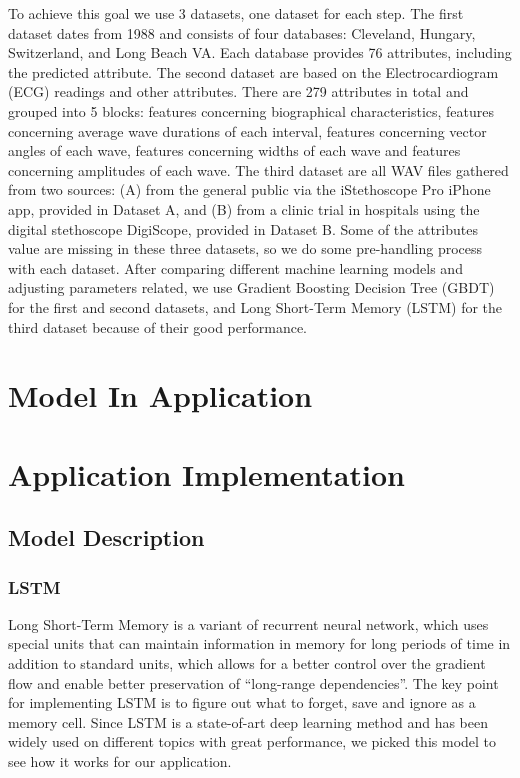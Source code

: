 \documentclass[letterpaper]{article} %
\begin{document}
To achieve this goal we use 3 datasets, one dataset for each step. The first dataset dates from 1988 and consists of four databases: Cleveland, Hungary, Switzerland, and Long Beach VA. Each database provides 76 attributes, including the predicted attribute. The second dataset are based on the Electrocardiogram (ECG) readings and other attributes. There are 279 attributes in total and grouped into 5 blocks: features concerning biographical characteristics, features concerning average wave durations of each interval, features concerning vector angles of each wave, features concerning widths of each wave and features concerning amplitudes of each wave. The third dataset are all WAV files gathered from two sources: (A) from the general public via the iStethoscope Pro iPhone app, provided in Dataset A, and (B) from a clinic trial in hospitals using the digital stethoscope DigiScope, provided in Dataset B. Some of the attributes value are missing in these three datasets, so we do some pre-handling process with each dataset. After comparing different machine learning models and adjusting parameters related, we use Gradient Boosting Decision Tree (GBDT) for the first and second datasets, and Long Short-Term Memory (LSTM) for the third dataset because of their good performance.


\section{Model In Application}

\section{Application Implementation}

\subsection{Model Description}

\subsubsection{LSTM}

Long Short-Term Memory is a variant of recurrent neural network, which uses special units that can maintain information in memory for long periods of time in addition to standard units, which allows for a better control over the gradient flow and enable better preservation of “long-range dependencies”. The key point for implementing LSTM is to figure out what to forget, save and ignore as a memory cell. Since LSTM is a state-of-art deep learning method and has been widely used on different topics with great performance, we picked this model to see how it works for our application.
\end{document}
